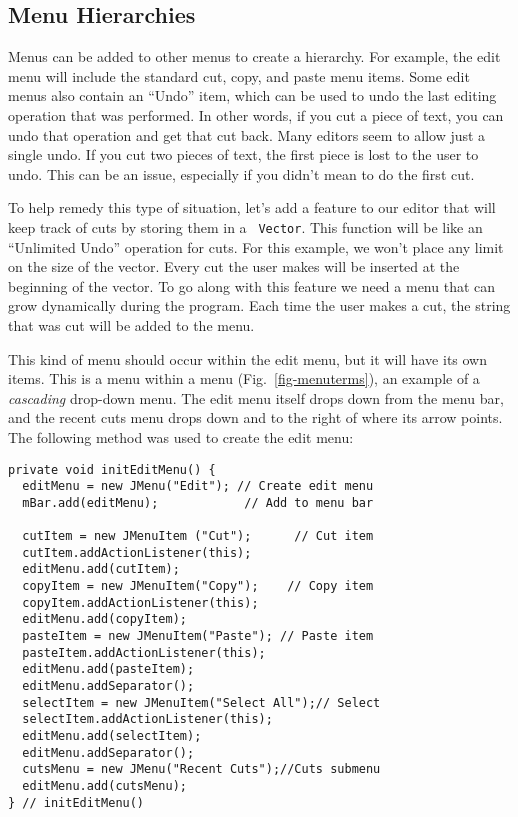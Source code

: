 \subsection{Menu Hierarchies}
\noindent Menus can be added to other menus to create a hierarchy. For
example, the edit menu will include the standard cut, copy, and paste
menu items.  Some edit menus also contain an ``Undo'' item, which can
be used to undo the last editing operation that was performed. In
other words, if you cut a piece of text, you can undo that operation
and get that cut back. Many editors seem to allow just a single
undo. If you cut two pieces of text, the first piece is lost to the
user to undo. This can be an issue, especially if you didn't mean to
do the first cut.

To help remedy this type of situation, let's add a feature to our
editor that will keep track of cuts by storing them in a {\tt
Vector}. This function will be like an ``Unlimited Undo'' operation
for cuts. For this example, we won't place any limit on the size of
the vector. Every cut the user makes will be inserted at the beginning
of the vector.  To go along with this feature we need a menu that can
grow dynamically during the program. Each time the user makes a cut,
the string that was cut will be added to the menu.


This kind of menu should occur within the edit menu, but it will have
its own items. This is a menu within a menu
(Fig.~\ref{fig-menuterms}), an example of a {\it cascading}
drop-down menu. The edit menu itself drops down from the menu bar,
and the recent cuts menu drops down and to the right of where its
arrow points. The following method was used to create the edit menu:

\begin{jjjlisting}
\begin{lstlisting}
private void initEditMenu() {
  editMenu = new JMenu("Edit"); // Create edit menu
  mBar.add(editMenu);            // Add to menu bar

  cutItem = new JMenuItem ("Cut");      // Cut item
  cutItem.addActionListener(this);
  editMenu.add(cutItem);
  copyItem = new JMenuItem("Copy");    // Copy item
  copyItem.addActionListener(this);
  editMenu.add(copyItem);
  pasteItem = new JMenuItem("Paste"); // Paste item
  pasteItem.addActionListener(this);
  editMenu.add(pasteItem);
  editMenu.addSeparator();
  selectItem = new JMenuItem("Select All");// Select
  selectItem.addActionListener(this);
  editMenu.add(selectItem);
  editMenu.addSeparator();
  cutsMenu = new JMenu("Recent Cuts");//Cuts submenu
  editMenu.add(cutsMenu);
} // initEditMenu()
\end{lstlisting}
\end{jjjlisting}

